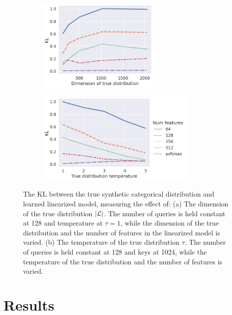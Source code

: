 \documentclass{article}
\begin{document}
\begin{figure}

 \begin{subfigure}[t]{0.47\textwidth}
  \centering
\includegraphics[height=4.5cm]{imgs/hmm/cat-kl.png}
\caption{}
\end{subfigure}
\begin{subfigure}[t]{0.43\textwidth}
\centering
\includegraphics[height=4.5cm]{imgs/hmm/cat-temp-kl.png}
\caption{}
\end{subfigure}
\caption{\label{fig:cat-kl}The KL between the true synthetic categorical distribution and learned linearized model, measuring the effect of: (a) The dimension of the true distribution $|\mathcal{L}|$. The number of queries is held constant at 128 and temperature at $\tau=1$, while the dimension of the true distribution 
and the number of features in the linearized model is varied. (b) The temperature of the true distribution $\tau$. The number of queries is held constant at 128 and keys at 1024, while the temperature of the true distribution 
and the number of features is varied.}
\end{figure}

\section{Results}
\end{document}
